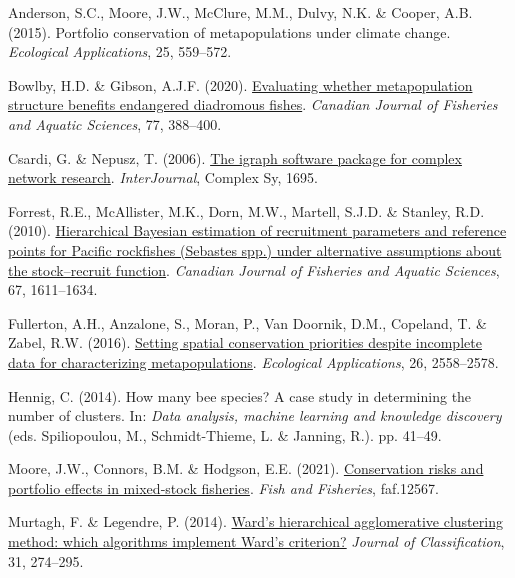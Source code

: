 \documentclass[
]{article}
\newlength{\cslhangindent}
\newlength{\cslentryspacingunit} %
\newenvironment{CSLReferences}[2] %
 {%
  \setlength{\parindent}{0pt}
  \ifodd #1
  \let\oldpar\par
  \def\par{\hangindent=\cslhangindent\oldpar}
  \fi
  \setlength{\parskip}{#2\cslentryspacingunit}
 }%
 {}
\begin{document}
\hypertarget{refs}{}
\begin{CSLReferences}{1}{0}
\leavevmode{}%
Anderson, S.C., Moore, J.W., McClure, M.M., Dulvy, N.K. \& Cooper, A.B.
(2015). {Portfolio conservation of metapopulations under climate
change.} \emph{Ecological Applications}, 25, 559--572.

\leavevmode{}%
Bowlby, H.D. \& Gibson, A.J.F. (2020).
\href{https://doi.org/10.1139/cjfas-2019-0001}{{Evaluating whether
metapopulation structure benefits endangered diadromous fishes}}.
\emph{Canadian Journal of Fisheries and Aquatic Sciences}, 77, 388--400.

\leavevmode{}%
Csardi, G. \& Nepusz, T. (2006). \href{https://igraph.org}{{The igraph
software package for complex network research}}. \emph{InterJournal},
Complex Sy, 1695.

\leavevmode{}%
Forrest, R.E., McAllister, M.K., Dorn, M.W., Martell, S.J.D. \& Stanley,
R.D. (2010). \href{https://doi.org/10.1139/f10-077}{{Hierarchical
Bayesian estimation of recruitment parameters and reference points for
Pacific rockfishes (Sebastes spp.) under alternative assumptions about
the stock--recruit function}}. \emph{Canadian Journal of Fisheries and
Aquatic Sciences}, 67, 1611--1634.

\leavevmode{}%
Fullerton, A.H., Anzalone, S., Moran, P., Van Doornik, D.M., Copeland,
T. \& Zabel, R.W. (2016).
\href{https://doi.org/10.1002/eap.1411}{{Setting spatial conservation
priorities despite incomplete data for characterizing metapopulations}}.
\emph{Ecological Applications}, 26, 2558--2578.

\leavevmode{}%
Hennig, C. (2014). {How many bee species? A case study in determining
the number of clusters}. In: \emph{Data analysis, machine learning and
knowledge discovery} (eds. Spiliopoulou, M., Schmidt-Thieme, L. \&
Janning, R.). pp. 41--49.

\leavevmode{}%
Moore, J.W., Connors, B.M. \& Hodgson, E.E. (2021).
\href{https://doi.org/10.1111/faf.12567}{{Conservation risks and
portfolio effects in mixed‐stock fisheries}}. \emph{Fish and Fisheries},
faf.12567.

\leavevmode{}%
Murtagh, F. \& Legendre, P. (2014).
\href{https://doi.org/10.1007/s00357-014-9161-z}{{Ward's hierarchical
agglomerative clustering method: which algorithms implement Ward's
criterion?}} \emph{Journal of Classification}, 31, 274--295.


\end{CSLReferences}
\end{document}
